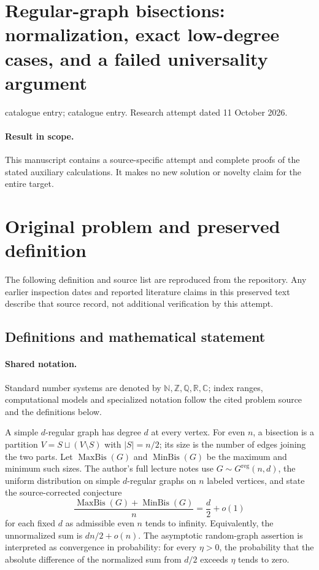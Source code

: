 \documentclass[11pt]{article}
\begin{document}
\section*{Regular-graph bisections: normalization, exact low-degree cases, and a failed universality argument}
\noindent catalogue entry; catalogue entry. Research attempt dated 11 October 2026.
\paragraph{Result in scope.}This manuscript contains a source-specific attempt and complete proofs of the stated auxiliary calculations. It makes no new solution or novelty claim for the entire target.
\section{Original problem and preserved definition}
The following definition and source list are reproduced from the repository. Any earlier inspection dates and reported literature claims in this preserved text describe that source record, not additional verification by this attempt.
\subsection{Definitions and mathematical statement}

\paragraph{Shared notation.}Standard number systems are denoted by $\mathbb N,\mathbb Z,\mathbb Q,\mathbb R,\mathbb C$; index ranges, computational models and specialized notation follow the cited problem source and the definitions below.


A simple $d$-regular graph has degree $d$ at every vertex. For even $n$, a bisection is a partition $V=S\sqcup(V\setminus S)$ with $|S|=n/2$; its size is the number of edges joining the two parts. Let $\operatorname{MaxBis}(G)$ and $\operatorname{MinBis}(G)$ be the maximum and minimum such sizes. The author's full lecture notes use $G\sim G^{\mathrm{reg}}(n,d)$, the uniform distribution on simple $d$-regular graphs on $n$ labeled vertices, and state the source-corrected conjecture
\[
 \frac{\operatorname{MaxBis}(G)+\operatorname{MinBis}(G)}{n}
 =\frac d2+o(1)
\]
for each fixed $d$ as admissible even $n$ tends to infinity. Equivalently, the unnormalized sum is $dn/2+o(n)$. The asymptotic random-graph assertion is interpreted as convergence in probability: for every $\eta>0$, the probability that the absolute difference of the normalized sum from $d/2$ exceeds $\eta$ tends to zero.
\end{document}
